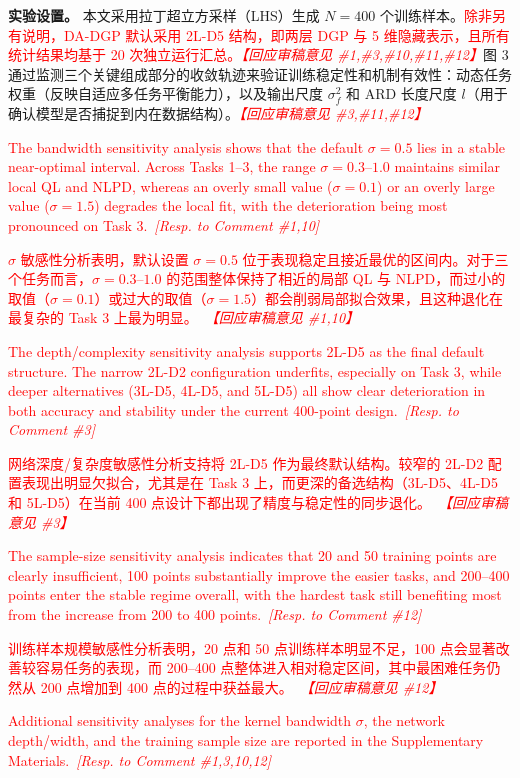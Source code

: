 \documentclass[11pt]{article}
\newcommand{\revEN}[2]{\textcolor{red}{#1\ \textit{[Resp. to Comment \##2]}}}
\newcommand{\revCN}[2]{\textcolor{red}{#1\ \textit{【回应审稿意见 \##2】}}}
\begin{document}
\textbf{实验设置。} 本文采用拉丁超立方采样（LHS）生成 $N=400$ 个训练样本。\textcolor{red}{除非另有说明，DA-DGP 默认采用 2L-D5 结构，即两层 DGP 与 5 维隐藏表示，且所有统计结果均基于 20 次独立运行汇总。\textit{【回应审稿意见 \#1,\#3,\#10,\#11,\#12】}}图 3 通过监测三个关键组成部分的收敛轨迹来验证训练稳定性和机制有效性：动态任务权重（反映自适应多任务平衡能力），以及输出尺度 $\sigma_f^2$ 和 ARD 长度尺度 $l$（用于确认模型是否捕捉到内在数据结构）。\textcolor{red}{\textit{【回应审稿意见 \#3,\#11,\#12】}}

\revEN{The bandwidth sensitivity analysis shows that the default $\sigma=0.5$ lies in a stable near-optimal interval. Across Tasks 1--3, the range $\sigma=0.3$--$1.0$ maintains similar local QL and NLPD, whereas an overly small value ($\sigma=0.1$) or an overly large value ($\sigma=1.5$) degrades the local fit, with the deterioration being most pronounced on Task 3.}{1,10}

\revCN{$\sigma$ 敏感性分析表明，默认设置 $\sigma=0.5$ 位于表现稳定且接近最优的区间内。对于三个任务而言，$\sigma=0.3$--$1.0$ 的范围整体保持了相近的局部 QL 与 NLPD，而过小的取值（$\sigma=0.1$）或过大的取值（$\sigma=1.5$）都会削弱局部拟合效果，且这种退化在最复杂的 Task 3 上最为明显。}{1,10}

\revEN{The depth/complexity sensitivity analysis supports 2L-D5 as the final default structure. The narrow 2L-D2 configuration underfits, especially on Task 3, while deeper alternatives (3L-D5, 4L-D5, and 5L-D5) all show clear deterioration in both accuracy and stability under the current 400-point design.}{3}

\revCN{网络深度/复杂度敏感性分析支持将 2L-D5 作为最终默认结构。较窄的 2L-D2 配置表现出明显欠拟合，尤其是在 Task 3 上，而更深的备选结构（3L-D5、4L-D5 和 5L-D5）在当前 400 点设计下都出现了精度与稳定性的同步退化。}{3}

\revEN{The sample-size sensitivity analysis indicates that 20 and 50 training points are clearly insufficient, 100 points substantially improve the easier tasks, and 200--400 points enter the stable regime overall, with the hardest task still benefiting most from the increase from 200 to 400 points.}{12}

\revCN{训练样本规模敏感性分析表明，20 点和 50 点训练样本明显不足，100 点会显著改善较容易任务的表现，而 200--400 点整体进入相对稳定区间，其中最困难任务仍然从 200 点增加到 400 点的过程中获益最大。}{12}

\revEN{Additional sensitivity analyses for the kernel bandwidth $\sigma$, the network depth/width, and the training sample size are reported in the Supplementary Materials.}{1,3,10,12}
\end{document}
